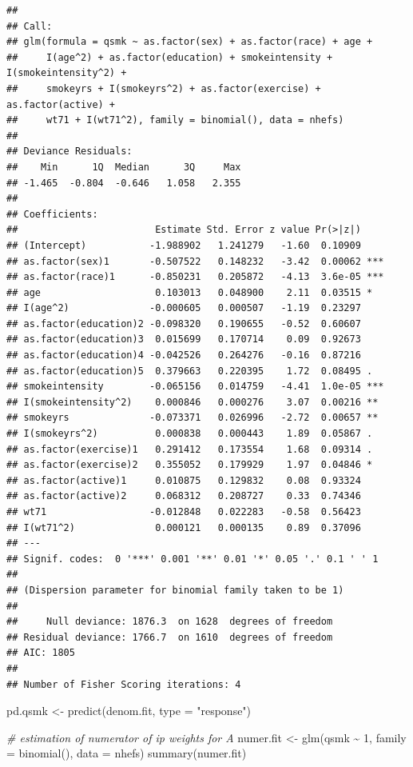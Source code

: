\documentclass[
  10pt,
]{book}
\newenvironment{Shaded}{\begin{snugshade}}{\end{snugshade}}
\newcommand{\AttributeTok}[1]{\textcolor[rgb]{0.77,0.63,0.00}{#1}}
\newcommand{\CommentTok}[1]{\textcolor[rgb]{0.56,0.35,0.01}{\textit{#1}}}
\newcommand{\DecValTok}[1]{\textcolor[rgb]{0.00,0.00,0.81}{#1}}
\newcommand{\FunctionTok}[1]{\textcolor[rgb]{0.00,0.00,0.00}{#1}}
\newcommand{\NormalTok}[1]{#1}
\newcommand{\OtherTok}[1]{\textcolor[rgb]{0.56,0.35,0.01}{#1}}
\newcommand{\SpecialCharTok}[1]{\textcolor[rgb]{0.00,0.00,0.00}{#1}}
\newcommand{\StringTok}[1]{\textcolor[rgb]{0.31,0.60,0.02}{#1}}
\begin{document}
\begin{verbatim}
## 
## Call:
## glm(formula = qsmk ~ as.factor(sex) + as.factor(race) + age + 
##     I(age^2) + as.factor(education) + smokeintensity + I(smokeintensity^2) + 
##     smokeyrs + I(smokeyrs^2) + as.factor(exercise) + as.factor(active) + 
##     wt71 + I(wt71^2), family = binomial(), data = nhefs)
## 
## Deviance Residuals: 
##    Min      1Q  Median      3Q     Max  
## -1.465  -0.804  -0.646   1.058   2.355  
## 
## Coefficients:
##                        Estimate Std. Error z value Pr(>|z|)    
## (Intercept)           -1.988902   1.241279   -1.60  0.10909    
## as.factor(sex)1       -0.507522   0.148232   -3.42  0.00062 ***
## as.factor(race)1      -0.850231   0.205872   -4.13  3.6e-05 ***
## age                    0.103013   0.048900    2.11  0.03515 *  
## I(age^2)              -0.000605   0.000507   -1.19  0.23297    
## as.factor(education)2 -0.098320   0.190655   -0.52  0.60607    
## as.factor(education)3  0.015699   0.170714    0.09  0.92673    
## as.factor(education)4 -0.042526   0.264276   -0.16  0.87216    
## as.factor(education)5  0.379663   0.220395    1.72  0.08495 .  
## smokeintensity        -0.065156   0.014759   -4.41  1.0e-05 ***
## I(smokeintensity^2)    0.000846   0.000276    3.07  0.00216 ** 
## smokeyrs              -0.073371   0.026996   -2.72  0.00657 ** 
## I(smokeyrs^2)          0.000838   0.000443    1.89  0.05867 .  
## as.factor(exercise)1   0.291412   0.173554    1.68  0.09314 .  
## as.factor(exercise)2   0.355052   0.179929    1.97  0.04846 *  
## as.factor(active)1     0.010875   0.129832    0.08  0.93324    
## as.factor(active)2     0.068312   0.208727    0.33  0.74346    
## wt71                  -0.012848   0.022283   -0.58  0.56423    
## I(wt71^2)              0.000121   0.000135    0.89  0.37096    
## ---
## Signif. codes:  0 '***' 0.001 '**' 0.01 '*' 0.05 '.' 0.1 ' ' 1
## 
## (Dispersion parameter for binomial family taken to be 1)
## 
##     Null deviance: 1876.3  on 1628  degrees of freedom
## Residual deviance: 1766.7  on 1610  degrees of freedom
## AIC: 1805
## 
## Number of Fisher Scoring iterations: 4
\end{verbatim}

\begin{Shaded}
\begin{Highlighting}[]
\NormalTok{pd.qsmk }\OtherTok{\textless{}{-}} \FunctionTok{predict}\NormalTok{(denom.fit, }\AttributeTok{type =} \StringTok{"response"}\NormalTok{)}

\CommentTok{\# estimation of numerator of ip weights for A}
\NormalTok{numer.fit }\OtherTok{\textless{}{-}} \FunctionTok{glm}\NormalTok{(qsmk }\SpecialCharTok{\textasciitilde{}} \DecValTok{1}\NormalTok{, }\AttributeTok{family =} \FunctionTok{binomial}\NormalTok{(), }\AttributeTok{data =}\NormalTok{ nhefs)}
\FunctionTok{summary}\NormalTok{(numer.fit)}
\end{Highlighting}
\end{Shaded}
\end{document}
